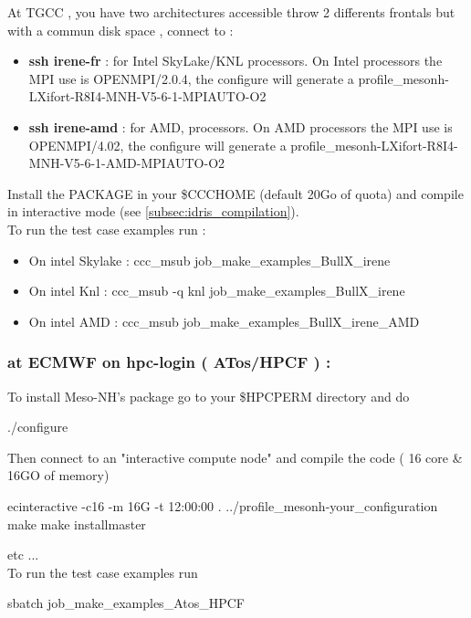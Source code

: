 At TGCC , you have two architectures accessible throw 2 differents frontals but with a commun disk space , connect to : 
\begin{itemize}
\item \textbf{ssh irene-fr} : for Intel SkyLake/KNL processors. On Intel processors the MPI use is OPENMPI/2.0.4, the configure will generate a profile\_mesonh-LXifort-R8I4-MNH-V5-6-1-MPIAUTO-O2
\item \textbf{ssh irene-amd} : for AMD, processors. On AMD processors the MPI use is OPENMPI/4.02, the configure  will generate a profile\_mesonh-LXifort-R8I4-MNH-V5-6-1-AMD-MPIAUTO-O2
\end{itemize}

Install the PACKAGE in your \$CCCHOME (default 20Go of quota) and compile in interactive mode (see \ref{subsec:idris_compilation}). \\

To run the test case examples  run :
\begin{itemize}
\item On intel Skylake : ccc\_msub job\_make\_examples\_BullX\_irene
\item On intel Knl : ccc\_msub -q knl job\_make\_examples\_BullX\_irene
\item On intel AMD : ccc\_msub job\_make\_examples\_BullX\_irene\_AMD
\end{itemize}

\subsubsection{at ECMWF on hpc-login ( ATos/HPCF ) :}

To install Meso-NH's package go to your \$HPCPERM directory and do
\begin{bashcode}
./configure
\end{bashcode}

Then connect to an "interactive compute node"  and compile the code ( 16 core & 16GO of memory)
\begin{bashcode}
ecinteractive -c16 -m 16G -t 12:00:00
. ../profile_mesonh-your_configuration
make
make installmaster
\end{bashcode}

etc ... \\

To run the test case examples  run
\begin{bashcode}
sbatch  job_make_examples_Atos_HPCF
\end{bashcode}

